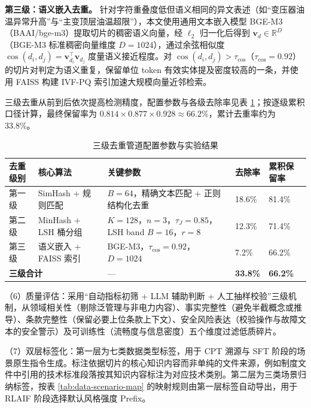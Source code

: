 \documentclass[fontset=fandol,type=master,campus=shenzhen,etitleauto=true]{hithesisbook}
\begin{document}
\textbf{第三级：语义嵌入去重。} 针对字符重叠度低但语义相同的异文表述（如``变压器油温异常升高''与``主变顶层油温超限''），本文使用通用文本嵌入模型 BGE-M3（BAAI/bge-m3）提取切片的稠密语义向量，经 $\ell_2$ 归一化后得到 $\mathbf{v}_d \in \mathbb{R}^{D}$（BGE-M3 标准稠密向量维度 $D = 1024$），通过余弦相似度 $\cos(d_i, d_j) = \mathbf{v}_{d_i}^{\top} \mathbf{v}_{d_j}$ 度量语义接近程度。对 $\cos(d_i, d_j) > \tau_{\cos}$（$\tau_{\cos} = 0.92$）的切片对判定为语义重复，保留单位 token 有效实体提及密度较高的一条，并使用 FAISS 构建 IVF-PQ 索引加速大规模向量近邻检索\cite{ref63}。

三级去重从前到后依次提高检测精度，配置参数与各级去除率见表 \ref{tab:dedup-pipeline}；按逐级累积口径计算，最终保留率为 $0.814 \times 0.877 \times 0.928 \approx 66.2\%$，累计去重率约为 33.8\%。

\begin{table}[htbp]
\centering
\caption{三级去重管道配置参数与实验结果}
\label{tab:dedup-pipeline}
\small
\setlength{\tabcolsep}{4pt}
\begin{tabular}{p{2.0cm}p{3.4cm}p{4.4cm}p{1.9cm}p{1.9cm}}
\toprule
\textbf{去重级别} & \textbf{核心算法} & \textbf{关键参数} & \textbf{去除率} & \textbf{累积保留率} \\
\midrule
第一级 & SimHash + 规则匹配 & $B = 64$，精确文本匹配 + 正则结构化去重 & 18.6\% & 81.4\% \\
\midrule
第二级 & MinHash + LSH 桶分组 & $K = 128$，$n = 3$，$\tau_J = 0.85$，LSH band $B = 16$，$r = 8$ & 12.3\% & 71.4\% \\
\midrule
第三级 & 语义嵌入 + FAISS 索引 & BGE-M3，$\tau_{\cos} = 0.92$，$D = 1024$ & 7.2\% & 66.2\% \\
\midrule
\multicolumn{2}{l}{\textbf{三级合计}} & --- & \textbf{33.8\%} & \textbf{66.2\%} \\
\bottomrule
\end{tabular}
\end{table}

\noindent （6）质量评估：采用``自动指标初筛 + LLM 辅助判断 + 人工抽样校验''三级机制，从领域相关性（剔除泛管理与非电力内容）、事实完整性（避免半截概念或推导）、条款完整性（保留必要上位条款上下文）、安全风险表达（校验操作与故障文本的安全警示）及可训练性（流畅度与信息密度）五个维度过滤低质碎片。

\noindent （7）双层标签化：第一层为七类数据类型标签，用于 CPT 溯源与 SFT 阶段的场景原生指令生成。标注依据切片的核心知识内容而非单纯的文件来源，例如制度文件中引用的技术标准段落按其知识内容标注为对应技术类别。第二层为三类场景归纳标签，按表 \ref{tab:data-scenario-map} 的映射规则由第一层标签自动导出，用于 RLAIF 阶段选择默认风格强度 Prefix。
\end{document}

